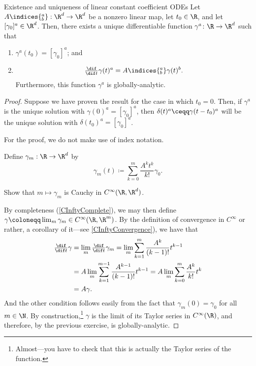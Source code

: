 \begin{thm}{Existence and uniqueness of linear constant coefficient ODEs}{}
Let $A\indices{^a_b}:\R ^d\rightarrow \R ^d$ be a nonzero linear map, let $t_0\in \R$, and let $[\gamma _0]^a\in \R ^d$.  Then, there exists a unique differentiable function $\gamma ^a\colon \R \rightarrow \R ^d$ such that
\begin{enumerate}
\item $\gamma ^a(t_0)=[\gamma _0]^a$; and
\item
\begin{equation}
\tfrac{\dif}{\dif t}\gamma (t)^a=A\indices{^a_b}\gamma (t)^b.
\end{equation}
Furthermore, this function $\gamma ^a$ is globally-analytic.
\end{enumerate}
\begin{proof}
Suppose we have proven the result for the case in which $t_0=0$.  Then, if $\gamma ^a$ is the unique solution with $\gamma (0)^a=[\gamma _0]^a$, then $\delta (t)^a\ceqq \gamma (t-t_0)^a$ will be the unique solution with $\delta (t_0)^a=[\gamma _0]^a$.

For the proof, we do not make use of index notation.

Define $\gamma _m:\R \rightarrow \R ^d$ by
\begin{equation}
\gamma _m(t)\coloneqq \sum _{k=0}^m\frac{A^kt^k}{k!}\gamma _0.
\end{equation}
\begin{exr}[breakable=false]{}{}
Show that $m\mapsto \gamma _m$ is Cauchy in $C^\infty (\R ,\R ^d)$.
\end{exr}
By completeness (\cref{CInftyComplete}), we may then define $\gamma \coloneqq \lim _m\gamma _m\in C^\infty (\R ,\R ^m)$.  By the definition of convergence in $C^\infty$ or rather, a corollary of it---see \cref{CInftyConvergence}), we have that
\begin{equation}
\begin{split}
\tfrac{\dif}{\dif t}\gamma & =\lim _m\tfrac{\dif}{\dif t}\gamma _m=\lim _m\sum _{k=1}^m\frac{A^k}{(k-1)!}t^{k-1} \\
& =A\lim _m\sum _{k=1}^{m-1}\frac{A^{k-1}}{(k-1)!}t^{k-1}=A\lim _m\sum _{k=0}^m\frac{A^k}{k!}t^k \\
& =A\gamma .
\end{split}
\end{equation}
And the other condition follows easily from the fact that $\gamma _m(0)=\gamma _0$ for all $m\in \N$.  By construction,\footnote{Almost---you have to check that this is actually the Taylor series of the function.} $\gamma$ is the limit of its Taylor series in $C^\infty (\R )$, and therefore, by the previous exercise, is globally-analytic.


\end{proof}
\end{thm}
